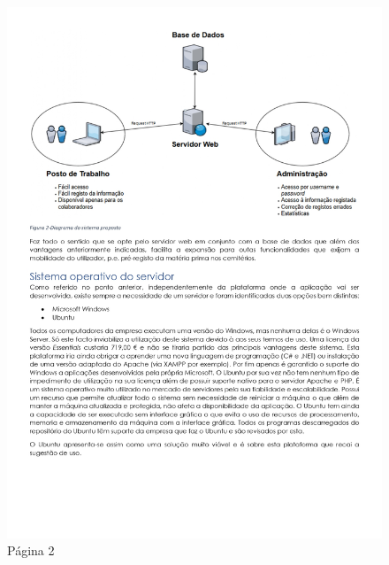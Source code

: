 \begin{figure}[H]
	\centering
	\includegraphics[width=\linewidth, frame]{figuras/Alternativas/pag2.jpg}
	\caption{Página 2}
	\label{fig:anexo_a_2}
\end{figure}
\newpage

